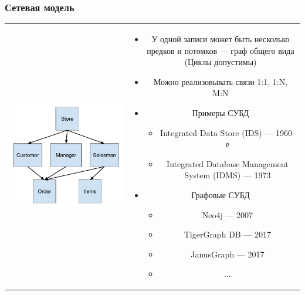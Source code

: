 \documentclass[aspectratio=169]{beamer}
\begin{document}
\begin{frame}[fragile]
  \transwipe[direction=90]
  \frametitle{Сетевая модель}
  
  \begin{tabular}{c c}
    \begin{minipage}{.4\textwidth}
      \includegraphics[width=\linewidth]{pictures/Network_model.pdf}
    \end{minipage}
    &
    \begin{minipage}{.55\textwidth}
      \begin{itemize}
        \item У одной записи может быть несколько предков и потомков --- граф общего вида (Циклы допустимы)
        \item Можно реализовывать связи 1:1, 1:N, M:N
        \item Примеры СУБД
          \begin{itemize}
            \item Integrated Data Store (IDS) --- 1960-е
            \item Integrated Database Management System (IDMS) --- 1973
          \end{itemize}
          \item Графовые СУБД
          \begin{itemize}
            \item Neo4j --- 2007
            \item TigerGraph DB --- 2017
            \item JanusGraph --- 2017
            \item ...
          \end{itemize}
      \end{itemize}
    \end{minipage}
  \end{tabular}
\end{frame}
\end{document}
